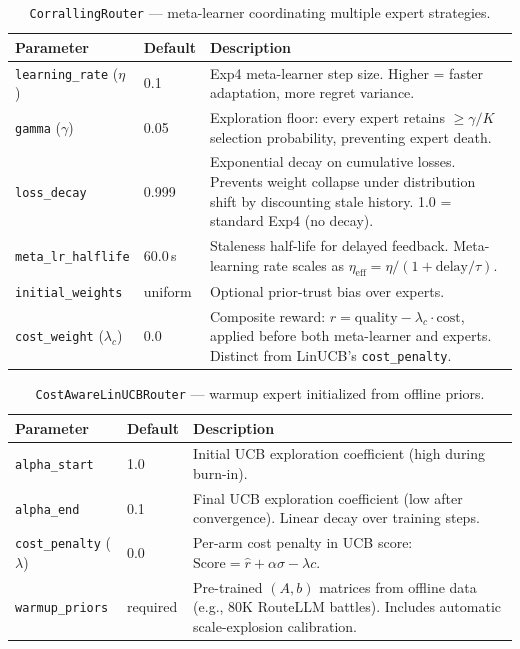 
\begin{table}[h]
\centering
\caption{\texttt{CorrallingRouter} --- meta-learner coordinating multiple expert strategies.}
\label{tab:corralling_library}
\small
\begin{tabular}{@{}llp{6.8cm}@{}}
\toprule
\textbf{Parameter} & \textbf{Default} & \textbf{Description} \\
\midrule
\texttt{learning\_rate} ($\eta$) & 0.1 & Exp4 meta-learner step size. Higher = faster adaptation, more regret variance. \\
\texttt{gamma} ($\gamma$) & 0.05 & Exploration floor: every expert retains $\geq \gamma/K$ selection probability, preventing expert death. \\
\texttt{loss\_decay} & 0.999 & Exponential decay on cumulative losses. Prevents weight collapse under distribution shift by discounting stale history. 1.0 = standard Exp4 (no decay). \\
\texttt{meta\_lr\_halflife} & 60.0\,s & Staleness half-life for delayed feedback. Meta-learning rate scales as $\eta_{\text{eff}} = \eta / (1 + \text{delay}/\tau)$. \\
\texttt{initial\_weights} & uniform & Optional prior-trust bias over experts. \\
\texttt{cost\_weight} ($\lambda_c$) & 0.0 & Composite reward: $r = \text{quality} - \lambda_c \cdot \text{cost}$, applied before both meta-learner and experts. Distinct from LinUCB's \texttt{cost\_penalty}. \\
\bottomrule
\end{tabular}
\end{table}


\begin{table}[h]
\centering
\caption{\texttt{CostAwareLinUCBRouter} --- warmup expert initialized from offline priors.}
\label{tab:warmup_library}
\small
\begin{tabular}{@{}llp{6.8cm}@{}}
\toprule
\textbf{Parameter} & \textbf{Default} & \textbf{Description} \\
\midrule
\texttt{alpha\_start} & 1.0 & Initial UCB exploration coefficient (high during burn-in). \\
\texttt{alpha\_end} & 0.1 & Final UCB exploration coefficient (low after convergence). Linear decay over training steps. \\
\texttt{cost\_penalty} ($\lambda$) & 0.0 & Per-arm cost penalty in UCB score: $\text{Score} = \hat{r} + \alpha\sigma - \lambda c$. \\
\texttt{warmup\_priors} & required & Pre-trained $(A, b)$ matrices from offline data (e.g., 80K RouteLLM battles). Includes automatic scale-explosion calibration. \\
\bottomrule
\end{tabular}
\end{table}


